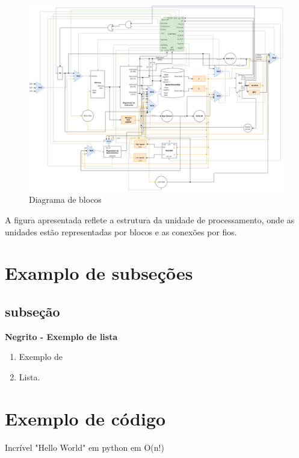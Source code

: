 \begin{figure}[htbp!]
\centering
\includegraphics[width=1\textwidth]{figure/diagrama_bloco.png}
\caption{Diagrama de blocos} 
\label{fig:diagrama_blocos}
\end{figure}

A figura apresentada reflete a estrutura da unidade de processamento, onde as unidades estão representadas por blocos e as conexões por fios.

\newpage

\section{Examplo de subseções}

\subsection{subseção}

\textbf{Negrito - Exemplo de lista}

\begin{enumerate}
    \item Exemplo de 
    \item Lista.
\end{enumerate}

\newpage

\section{Exemplo de código}

Incrível "Hello World" em python em O(n!)



